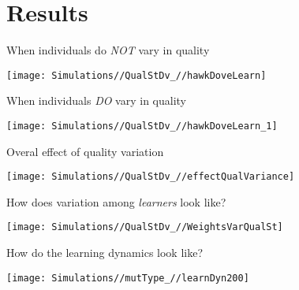 \documentclass[
  ignorenonframetext,
]{beamer}
\begin{document}
\hypertarget{results}{%
\section{Results}\label{results}}

\begin{frame}{When individuals do \emph{NOT} vary in quality}
\protect\hypertarget{when-individuals-do-not-vary-in-quality}{}

\begin{center}\texttt{[image: Simulations//QualStDv\_//hawkDoveLearn]} \end{center}

\end{frame}

\begin{frame}{When individuals \emph{DO} vary in quality}
\protect\hypertarget{when-individuals-do-vary-in-quality}{}

\begin{center}\texttt{[image: Simulations//QualStDv\_//hawkDoveLearn\_1]} \end{center}

\end{frame}

\begin{frame}{Overal effect of quality variation}
\protect\hypertarget{overal-effect-of-quality-variation}{}

\begin{center}\texttt{[image: Simulations//QualStDv\_//effectQualVariance]} \end{center}

\end{frame}

\begin{frame}{How does variation among \emph{learners} look like?}
\protect\hypertarget{how-does-variation-among-learners-look-like}{}

\begin{center}\texttt{[image: Simulations//QualStDv\_//WeightsVarQualSt]} \end{center}

\end{frame}

\begin{frame}{How do the learning dynamics look like?}
\protect\hypertarget{how-do-the-learning-dynamics-look-like}{}

\texttt{[image: Simulations//mutType\_//learnDyn200]}

\end{frame}
\end{document}
